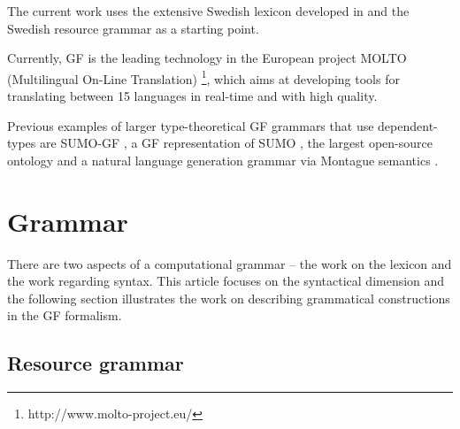 \documentclass[runningheads,a4paper]{llncs}
\begin{document}
The current work uses the extensive Swedish
lexicon developed in \cite{ahlbergEnache} and the Swedish resource
grammar as a starting point. 

Currently, GF is the leading technology in the European project
MOLTO (Multilingual On-Line Translation)
\footnote{http://www.molto-project.eu/}, which aims at developing
 tools for translating between 15 languages in real-time and with high quality. 

Previous examples of larger type-theoretical GF grammars that use 
dependent-types are SUMO-GF \cite{ontologies2}, a GF representation of
SUMO \cite{sumo}, the largest open-source ontology and  a natural
language generation grammar via Montague semantics \cite{montague}.



\section{Grammar}

There are two aspects of a computational grammar -- the work on the lexicon
and the work regarding syntax.  
This article focuses on the syntactical dimension and the following section
illustrates the work on describing grammatical constructions in the GF 
formalism.

\subsection{Resource grammar}
\end{document}
